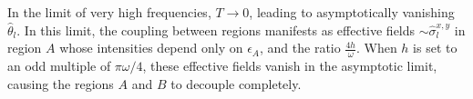 \documentclass[12pt]{iopart}
\begin{document}
In the limit of very high frequencies, $T\rightarrow 0$, leading to asymptotically vanishing $\hat{\theta}_l$. In this limit, the coupling between regions manifests as effective fields $\sim \hat{\sigma}^{x,y}_l$ in region $A$ whose intensities depend only on $\epsilon_A$, and the ratio $\frac{4h}{\omega}$. When $h$ is set to an odd multiple of $\pi\omega/4$, these effective fields vanish in the asymptotic limit, causing the regions $A$ and $B$ to decouple completely.
\end{document}
